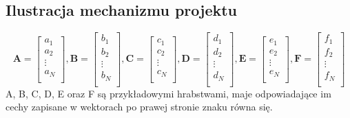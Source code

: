 \documentclass[a4paper,12pt]{article}
\begin{document}
\subsection*{Ilustracja mechanizmu projektu}
\begin{equation}
    \mathbf{A} = \begin{bmatrix}
        a_1    \\
        a_2    \\
        \vdots \\
        a_N    \\
    \end{bmatrix},
    \mathbf{B} = \begin{bmatrix}
        b_1    \\
        b_2    \\
        \vdots \\
        b_N    \\
    \end{bmatrix},
    \mathbf{C} = \begin{bmatrix}
        c_1    \\
        c_2    \\
        \vdots \\
        c_N    \\
    \end{bmatrix},
    \mathbf{D} = \begin{bmatrix}
        d_1    \\
        d_2    \\
        \vdots \\
        d_N    \\
    \end{bmatrix},
    \mathbf{E} = \begin{bmatrix}
        e_1    \\
        e_2    \\
        \vdots \\
        e_N    \\
    \end{bmatrix},
    \mathbf{F} = \begin{bmatrix}
        f_1    \\
        f_2    \\
        \vdots \\
        f_N    \\
    \end{bmatrix}
\end{equation}
A, B, C, D, E oraz F są przykładowymi hrabstwami, maje odpowiadające im cechy zapisane w wektorach po prawej stronie znaku równa się.
\end{document}
